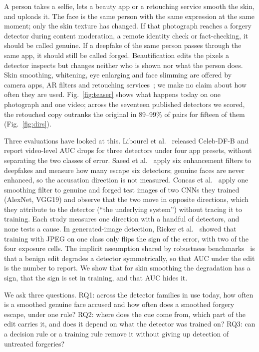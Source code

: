 \documentclass[journal]{IEEEtran}  %
\begin{document}
A person takes a selfie, lets a beauty app or a retouching service smooth the skin, and uploads it. The face is the same person with the same
expression at the same moment; only the skin texture has changed. If that photograph reaches a forgery detector during
content moderation, a remote identity check or fact-checking, it should be called genuine. If a deepfake of the same person
passes through the same app, it should still be called forged. Beautification edits the pixels a detector inspects but
changes neither who is shown nor what the person does. Skin smoothing, whitening, eye enlarging and face slimming are offered
by camera apps, AR filters and retouching services~\cite{openfilter2022,retouchingffhq,libourel2024}; we make no claim about
how often they are used. Fig.~\ref{fig:teaser} shows what happens today on one photograph and one video; across the seventeen published detectors we
scored, the retouched copy outranks the original in 89--99\% of pairs for fifteen of them (Fig.~\ref{fig:dirs}).

Three evaluations have looked at this. Libourel et al.~\cite{libourel2024} released Celeb-DF-B and report video-level AUC
drops for three detectors under four app presets, without separating the two classes of error. Saeed et al.~\cite{saeed2025}
apply six enhancement filters to deepfakes and measure how many escape six detectors; genuine faces are never enhanced, so
the accusation direction is not measured. Concas et al.~\cite{concas2025} apply one smoothing filter to genuine and forged
test images of two CNNs they trained (AlexNet, VGG19) and observe that the two move in opposite directions, which they attribute to the detector (``the underlying system'') without tracing it to training. Each study measures one direction with a handful of detectors, and none tests a cause. In generated-image detection, Ricker et
al.~\cite{ricker2026biasid} showed that training with JPEG on one class only flips the sign of the error, with two of the
four exposure cells. The implicit assumption shared by robustness benchmarks~\cite{deeperforensics2020,moire2025,hendrycks2019}
is that a benign edit degrades a detector symmetrically, so that AUC under the edit is the number to report. We show that for
skin smoothing the degradation has a sign, that the sign is set in training, and that AUC hides it.

We ask three questions. RQ1: across the detector families in use today, how often is a smoothed genuine face accused and
how often does a smoothed forgery escape, under one rule? RQ2: where does the cue come from, which part of the edit carries
it, and does it depend on what the detector was trained on? RQ3: can a decision rule or a training rule remove it without
giving up detection of untreated forgeries?
\end{document}
